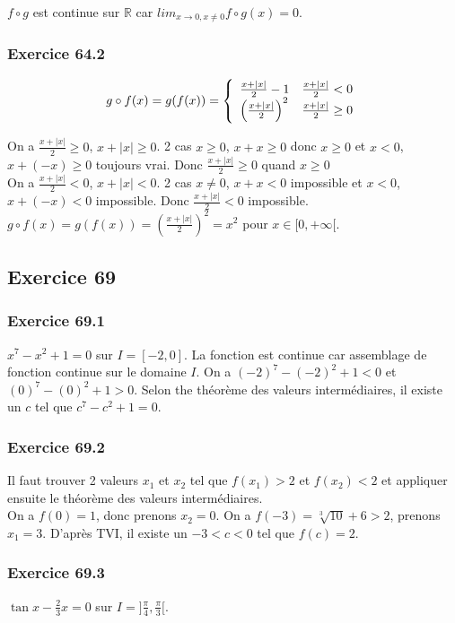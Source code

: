 \documentclass[]{book}
\theoremstyle{definition}
\newcommand{\bb}[1]{\mathbb{#1}}
\newcommand{\R}{\bb{R}}
\begin{document}
$f \circ g$ est continue sur $\R$ car $lim_{x \to 0, x \neq 0} f \circ g(x) = 0$. 

\subsubsection*{Exercice 64.2}
$$g \circ f(x) = g(f(x)) = 
\left\{ 
\begin{array}{l l}
\frac{x+|x|}{2}-1 & \frac{x+|x|}{2} < 0\\
\left(\frac{x+|x|}{2}\right)^2 & \frac{x+|x|}{2} \geq 0\\
\end{array}
\right.
$$

On a $\frac{x+|x|}{2} \geq 0$, $x+|x| \geq 0$. 2 cas $x \geq 0$, $x+x \geq 0$ donc $x \geq 0$ et $x < 0$, $x+(-x) \geq 0$ toujours vrai. Donc $\frac{x+|x|}{2} \geq 0$ quand $x \geq 0$\\

On a $\frac{x+|x|}{2} < 0$, $x+|x| < 0$. 2 cas $x \neq 0$, $x+x < 0$ impossible et $x < 0$, $x+(-x) < 0$ impossible. Donc $\frac{x+|x|}{2} < 0$ impossible.\\
$g \circ f(x) = g(f(x)) = \left(\frac{x+|x|}{2}\right)^2 = x^2$ pour $x \in [0,+\infty[$.


\subsection*{Exercice 69}
\subsubsection*{Exercice 69.1}
$x^7-x^2+1 = 0$ sur $I = [-2,0]$. La fonction est continue car assemblage de fonction continue sur le domaine $I$. On a $(-2)^7 - (-2)^2 + 1 < 0$ et $ (0)^7 - (0)^2 + 1 > 0$. Selon the th\'eor\`eme des valeurs interm\'ediaires, il existe un $c$ tel que $c^7-c^2+1 = 0$.

\subsubsection*{Exercice 69.2}
Il faut trouver 2 valeurs $x_1$ et $x_2$ tel que $f(x_1) > 2$ et $f(x_2) < 2 $ et appliquer ensuite le th\'eor\`eme des valeurs interm\'ediaires.\\

On a $f(0) = 1$, donc prenons $x_2 = 0$. On a $f(-3) = \sqrt[3]{10} + 6 > 2$, prenons $x_1 = 3$. D'apr\`es TVI, il existe un $-3<c<0$ tel que $f(c) = 2$.

\subsubsection*{Exercice 69.3}
$\tan x - \frac{2}{3}x = 0$ sur $I = ]\frac{\pi}{4},\frac{\pi}{3}[$.
\end{document}
